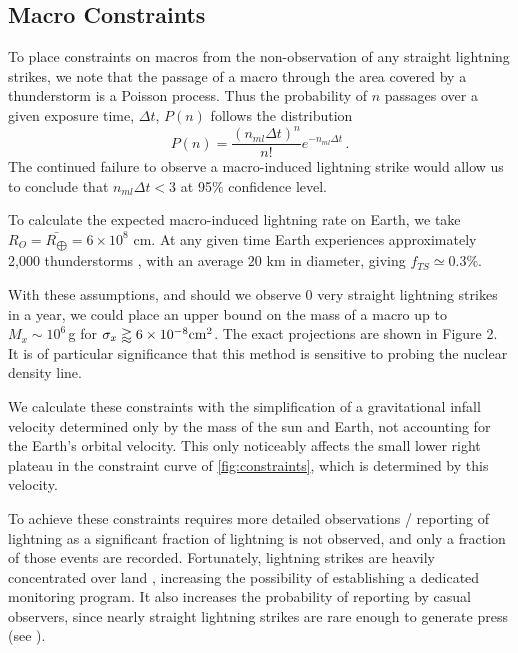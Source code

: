 \documentclass[%
 reprint,
 amsmath,amssymb,
 aps,
]{revtex4-2}
\begin{document}

    \subsection{Macro Constraints} %
    \label{sub:macro_constraints_on_earth}

        To place constraints on macros from the non-observation of any straight lightning strikes, we note that the passage of a macro through the area covered by a thunderstorm is a Poisson process. Thus the probability of $n$ passages over a given exposure time, $\Delta t$, $P(n)$ follows the distribution
        \begin{equation}\label{eq:poisson}
            P(n) = \frac{\left({n_{ml} \Delta t}\right)^n}{n!} e^{-n_{ml} \Delta t}\,.
        \end{equation}
        The continued failure to observe a macro-induced lightning strike would allow us to conclude that $n_{ml}\Delta t<3$ at 95$\%$ confidence level.

        To calculate the expected macro-induced lightning rate on Earth,  we take $R_{O} = \bar{R_{\bigoplus}} = 6 \times 10^8$ cm.  At any given time Earth experiences approximately 2,000 thunderstorms \citep{NatGeo}, with an average $20$ km in diameter, giving $f_{TS}\simeq 0.3\%$.

        With these assumptions, and should we observe 0 very straight lightning strikes in a year, we could place an upper bound on the mass of a macro up to $M_x \sim 10^6\,$g for $\sigma_x\gtrapprox6\times10^{-8}{\rm cm}^2$. The exact projections are shown in Figure 2. It is of particular significance that this method is sensitive to probing the nuclear density line.
        
        We calculate these constraints with the simplification of a gravitational infall velocity determined only by the mass of the sun and Earth, not accounting for the Earth's orbital velocity. This only noticeably affects the small lower right plateau in the constraint curve of \ref{fig:constraints}, which is determined by this velocity.

        To achieve these constraints requires more detailed observations / reporting of lightning as a significant fraction of lightning is not observed, and only a fraction of those events are recorded. Fortunately, lightning strikes are heavily concentrated over land \citep{Christian2003},  increasing the possibility of establishing a dedicated monitoring program.  It also increases the probability of reporting by casual observers, since nearly straight lightning strikes are rare enough to generate press (see \cite{Zimbabwe}).
\end{document}
